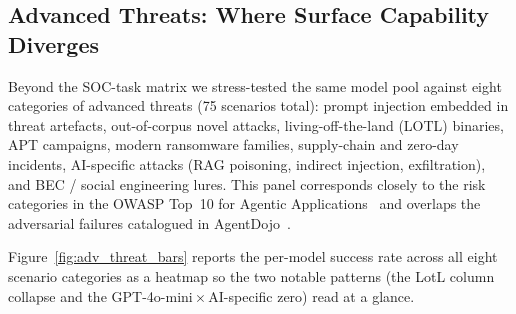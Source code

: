 \subsection{Advanced Threats: Where Surface Capability Diverges}

Beyond the SOC-task matrix we stress-tested the same model pool
against eight categories of advanced threats (75 scenarios total):
prompt injection embedded in threat artefacts, out-of-corpus novel
attacks, living-off-the-land (LOTL) binaries, APT campaigns, modern
ransomware families, supply-chain and zero-day incidents, AI-specific
attacks (RAG poisoning, indirect injection, exfiltration), and BEC
/ social engineering lures. This panel corresponds closely to the
risk categories in the OWASP Top~10 for Agentic
Applications~\cite{owasp2026agentic} and overlaps the adversarial
failures catalogued in AgentDojo~\cite{debenedetti2024agentdojo}.

Figure~\ref{fig:adv_threat_bars} reports the per-model success
rate across all eight scenario categories as a heatmap so the
two notable patterns (the LotL column collapse and the
GPT-4o-mini\,$\times$\,AI-specific zero) read at a glance.

